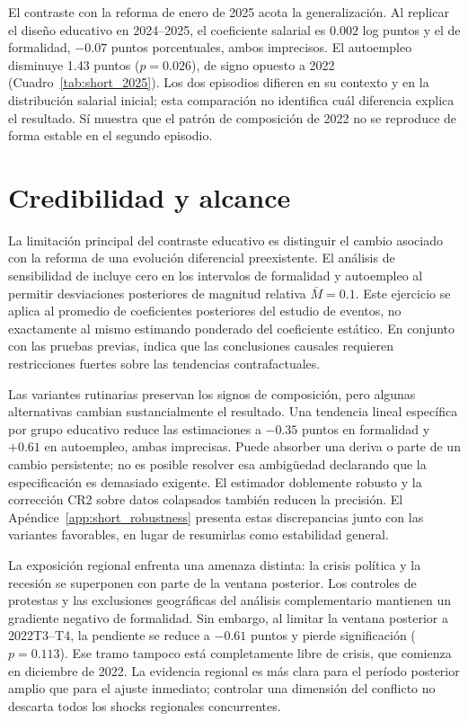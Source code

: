 El contraste con la reforma de enero de 2025 acota la generalización. Al replicar el diseño educativo en 2024--2025, el coeficiente salarial es $0.002$ log puntos y el de formalidad, $-0.07$ puntos porcentuales, ambos imprecisos. El autoempleo disminuye 1.43 puntos ($p=0.026$), de signo opuesto a 2022 (Cuadro~\ref{tab:short_2025}). Los dos episodios difieren en su contexto y en la distribución salarial inicial; esta comparación no identifica cuál diferencia explica el resultado. Sí muestra que el patrón de composición de 2022 no se reproduce de forma estable en el segundo episodio.
\FloatBarrier

\section{Credibilidad y alcance}

La limitación principal del contraste educativo es distinguir el cambio asociado con la reforma de una evolución diferencial preexistente. El análisis de sensibilidad de \citet{rambachan_roth_2023} incluye cero en los intervalos de formalidad y autoempleo al permitir desviaciones posteriores de magnitud relativa $\bar M=0.1$. Este ejercicio se aplica al promedio de coeficientes posteriores del estudio de eventos, no exactamente al mismo estimando ponderado del coeficiente estático. En conjunto con las pruebas previas, indica que las conclusiones causales requieren restricciones fuertes sobre las tendencias contrafactuales.

Las variantes rutinarias preservan los signos de composición, pero algunas alternativas cambian sustancialmente el resultado. Una tendencia lineal específica por grupo educativo reduce las estimaciones a $-0.35$ puntos en formalidad y $+0.61$ en autoempleo, ambas imprecisas. Puede absorber una deriva o parte de un cambio persistente; no es posible resolver esa ambigüedad declarando que la especificación es demasiado exigente. El estimador doblemente robusto y la corrección CR2 sobre datos colapsados también reducen la precisión. El Apéndice~\ref{app:short_robustness} presenta estas discrepancias junto con las variantes favorables, en lugar de resumirlas como estabilidad general.

La exposición regional enfrenta una amenaza distinta: la crisis política y la recesión se superponen con parte de la ventana posterior. Los controles de protestas y las exclusiones geográficas del análisis complementario mantienen un gradiente negativo de formalidad. Sin embargo, al limitar la ventana posterior a 2022T3--T4, la pendiente se reduce a $-0.61$ puntos y pierde significación ($p=0.113$). Ese tramo tampoco está completamente libre de crisis, que comienza en diciembre de 2022. La evidencia regional es más clara para el período posterior amplio que para el ajuste inmediato; controlar una dimensión del conflicto no descarta todos los shocks regionales concurrentes.

